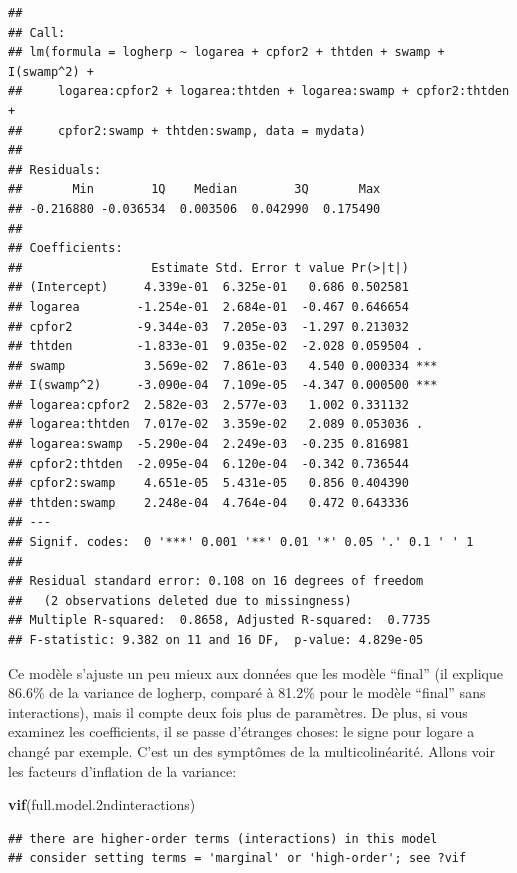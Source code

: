 \documentclass[
  12pt,
]{book}
\newenvironment{Shaded}{\begin{snugshade}}{\end{snugshade}}
\newcommand{\FloatTok}[1]{\textcolor[rgb]{0.00,0.00,0.81}{#1}}
\newcommand{\KeywordTok}[1]{\textcolor[rgb]{0.13,0.29,0.53}{\textbf{#1}}}
\newcommand{\NormalTok}[1]{#1}
\begin{document}
\begin{verbatim}
## 
## Call:
## lm(formula = logherp ~ logarea + cpfor2 + thtden + swamp + I(swamp^2) + 
##     logarea:cpfor2 + logarea:thtden + logarea:swamp + cpfor2:thtden + 
##     cpfor2:swamp + thtden:swamp, data = mydata)
## 
## Residuals:
##       Min        1Q    Median        3Q       Max 
## -0.216880 -0.036534  0.003506  0.042990  0.175490 
## 
## Coefficients:
##                  Estimate Std. Error t value Pr(>|t|)    
## (Intercept)     4.339e-01  6.325e-01   0.686 0.502581    
## logarea        -1.254e-01  2.684e-01  -0.467 0.646654    
## cpfor2         -9.344e-03  7.205e-03  -1.297 0.213032    
## thtden         -1.833e-01  9.035e-02  -2.028 0.059504 .  
## swamp           3.569e-02  7.861e-03   4.540 0.000334 ***
## I(swamp^2)     -3.090e-04  7.109e-05  -4.347 0.000500 ***
## logarea:cpfor2  2.582e-03  2.577e-03   1.002 0.331132    
## logarea:thtden  7.017e-02  3.359e-02   2.089 0.053036 .  
## logarea:swamp  -5.290e-04  2.249e-03  -0.235 0.816981    
## cpfor2:thtden  -2.095e-04  6.120e-04  -0.342 0.736544    
## cpfor2:swamp    4.651e-05  5.431e-05   0.856 0.404390    
## thtden:swamp    2.248e-04  4.764e-04   0.472 0.643336    
## ---
## Signif. codes:  0 '***' 0.001 '**' 0.01 '*' 0.05 '.' 0.1 ' ' 1
## 
## Residual standard error: 0.108 on 16 degrees of freedom
##   (2 observations deleted due to missingness)
## Multiple R-squared:  0.8658, Adjusted R-squared:  0.7735 
## F-statistic: 9.382 on 11 and 16 DF,  p-value: 4.829e-05
\end{verbatim}

Ce modèle s'ajuste un peu mieux aux données que les modèle ``final'' (il explique 86.6\% de la variance de logherp, comparé à 81.2\% pour le modèle ``final'' sans interactions), mais il compte deux fois plus de paramètres. De plus, si vous examinez les coefficients, il se passe d'étranges choses: le signe pour logare a changé par exemple. C'est un des symptômes de la multicolinéarité. Allons voir les facteurs d'inflation de la variance:

\begin{Shaded}
\begin{Highlighting}[]
\KeywordTok{vif}\NormalTok{(full.model}\FloatTok{.2}\NormalTok{ndinteractions)}
\end{Highlighting}
\end{Shaded}

\begin{verbatim}
## there are higher-order terms (interactions) in this model
## consider setting terms = 'marginal' or 'high-order'; see ?vif
\end{verbatim}
\end{document}
